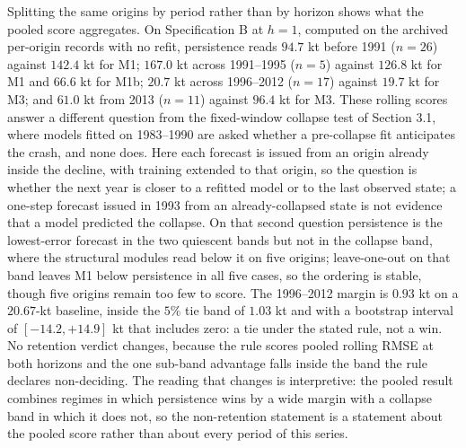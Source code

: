 \documentclass[11pt]{article}
\begin{document}
Splitting the same origins by period rather than by horizon shows what
the pooled score aggregates. On Specification B at \(h=1\), computed on
the archived per-origin records with no refit, persistence reads
\(94.7\) kt before 1991 (\(n=26\)) against \(142.4\) kt for M1;
\(167.0\) kt across 1991--1995 (\(n=5\)) against \(126.8\) kt for M1
and \(66.6\) kt for M1b; \(20.7\) kt across 1996--2012 (\(n=17\))
against \(19.7\) kt for M3; and \(61.0\) kt from 2013 (\(n=11\))
against \(96.4\) kt for M3. These rolling scores answer a different question from the fixed-window
collapse test of Section 3.1, where models fitted on 1983--1990 are
asked whether a pre-collapse fit anticipates the crash, and none does.
Here each forecast is issued from an origin already inside the decline,
with training extended to that origin, so the question is whether the
next year is closer to a refitted model or to the last observed state; a
one-step forecast issued in 1993 from an already-collapsed state is not
evidence that a model predicted the collapse. On that second question
persistence is the lowest-error forecast in the two quiescent bands but
not in the collapse band, where the structural modules read below it on
five origins; leave-one-out on
that band leaves M1 below persistence in all five cases, so the ordering
is stable, though five origins remain too few to score. The
1996--2012 margin is \(0.93\) kt on a \(20.67\)-kt baseline, inside the
\(5\%\) tie band of \(1.03\) kt and with a bootstrap interval of
\([-14.2, +14.9]\) kt that includes zero: a tie under the stated rule,
not a win. No retention verdict changes, because the rule scores pooled
rolling RMSE at both horizons and the one sub-band advantage falls
inside the band the rule declares non-deciding. The reading that changes
is interpretive: the pooled result combines regimes in which persistence
wins by a wide margin with a collapse band in which it does not, so the
non-retention statement is a statement about the pooled score rather
than about every period of this series.
\end{document}
